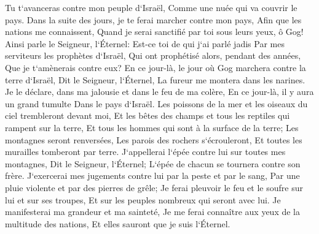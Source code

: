 \verse Tu t`avanceras contre mon peuple d`Israël, Comme une nuée qui va couvrir le pays. Dans la suite des jours, je te ferai marcher contre mon pays, Afin que les nations me connaissent, Quand je serai sanctifié par toi sous leurs yeux, ô Gog! 
\verse Ainsi parle le Seigneur, l`Éternel: Est-ce toi de qui j`ai parlé jadis Par mes serviteurs les prophètes d`Israël, Qui ont prophétisé alors, pendant des années, Que je t`amènerais contre eux? 
\verse En ce jour-là, le jour où Gog marchera contre la terre d`Israël, Dit le Seigneur, l`Éternel, La fureur me montera dans les narines. 
\verse Je le déclare, dans ma jalousie et dans le feu de ma colère, En ce jour-là, il y aura un grand tumulte Dans le pays d`Israël. 
\verse Les poissons de la mer et les oiseaux du ciel trembleront devant moi, Et les bêtes des champs et tous les reptiles qui rampent sur la terre, Et tous les hommes qui sont à la surface de la terre; Les montagnes seront renversées, Les parois des rochers s`écrouleront, Et toutes les murailles tomberont par terre. 
\verse J`appellerai l`épée contre lui sur toutes mes montagnes, Dit le Seigneur, l`Éternel; L`épée de chacun se tournera contre son frère. 
\verse J`exercerai mes jugements contre lui par la peste et par le sang, Par une pluie violente et par des pierres de grêle; Je ferai pleuvoir le feu et le soufre sur lui et sur ses troupes, Et sur les peuples nombreux qui seront avec lui. 
\verse Je manifesterai ma grandeur et ma sainteté, Je me ferai connaître aux yeux de la multitude des nations, Et elles sauront que je suis l`Éternel. 

\chapter{}


